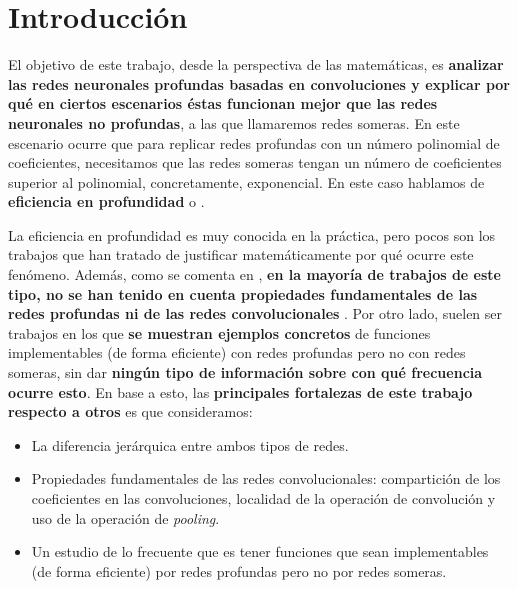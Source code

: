 \chapter{Introducción}\label{ch:introduccion}

El objetivo de este trabajo, desde la perspectiva de las matemáticas, es \textbf{analizar las redes neuronales profundas basadas en convoluciones y explicar por qué en ciertos escenarios éstas funcionan mejor que las redes neuronales no profundas}, a las que llamaremos redes someras. En este escenario ocurre que para replicar redes profundas con un número polinomial de coeficientes, necesitamos que las redes someras tengan un número de coeficientes superior al polinomial, concretamente, exponencial. En este caso hablamos de \textbf{eficiencia en profundidad} o \textbf{}.

La eficiencia en profundidad es muy conocida en la práctica, pero pocos son los trabajos que han tratado de justificar matemáticamente por qué ocurre este fenómeno. Además, como se comenta en \cite{matematicas:principal}, \textbf{en la mayoría de trabajos de este tipo, no se han tenido en cuenta propiedades fundamentales de las redes profundas ni de las redes convolucionales} \cite{matematicas:paper_depth_malo_01} \cite{matematicas:paper_depth_malo_02} \cite{matematicas:paper_depth_malo_03}. Por otro lado, suelen ser trabajos en los que \textbf{se muestran ejemplos concretos} de funciones implementables (de forma eficiente) con redes profundas pero no con redes someras, sin dar \textbf{ningún tipo de información sobre con qué frecuencia ocurre esto}. En base a esto, las \textbf{principales fortalezas de este trabajo respecto a otros} es que consideramos:

\begin{itemize}
	\item La diferencia jerárquica entre ambos tipos de redes.
	\item Propiedades fundamentales de las redes convolucionales: compartición de los coeficientes en las convoluciones, localidad de la operación de convolución y uso de la operación de \textit{pooling}.
	\item Un estudio de lo frecuente que es tener funciones que sean implementables (de forma eficiente) por redes profundas pero no por redes someras.
\end{itemize}


